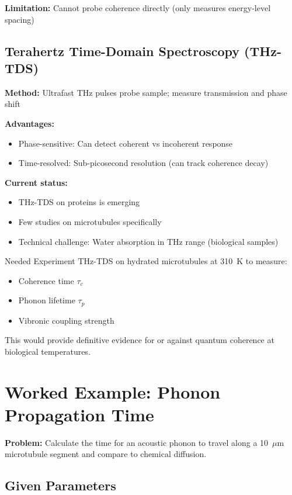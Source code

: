 \textbf{Limitation:} Cannot probe coherence directly (only measures energy-level spacing)

\subsection{Terahertz Time-Domain Spectroscopy (THz-TDS)}

\textbf{Method:} Ultrafast THz pulses probe sample; measure transmission and phase shift

\textbf{Advantages:}
\begin{itemize}
\item Phase-sensitive: Can detect coherent vs incoherent response
\item Time-resolved: Sub-picosecond resolution (can track coherence decay)
\end{itemize}

\textbf{Current status:}
\begin{itemize}
\item THz-TDS on proteins is emerging
\item Few studies on microtubules specifically
\item Technical challenge: Water absorption in THz range (biological samples)
\end{itemize}

\begin{calloutbox}{Needed Experiment}
THz-TDS on hydrated microtubules at 310~K to measure:
\begin{itemize}
\item Coherence time $\tau_c$
\item Phonon lifetime $\tau_p$
\item Vibronic coupling strength
\end{itemize}
This would provide definitive evidence for or against quantum coherence at biological temperatures.
\end{calloutbox}

\section{Worked Example: Phonon Propagation Time}

\textbf{Problem:} Calculate the time for an acoustic phonon to travel along a 10~$\mu$m microtubule segment and compare to chemical diffusion.

\subsection*{Given Parameters}

